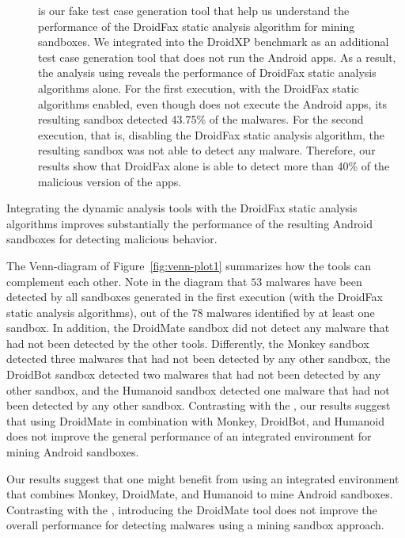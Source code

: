 \begin{description}
  \item[\joke] is our fake test case generation tool that help us understand the performance of the DroidFax static analysis algorithm for mining sandboxes. 
    We integrated \joke into the DroidXP benchmark as an additional test case generation tool that does not run the Android apps.
    As a result, the analysis using \joke reveals the performance of DroidFax static analysis algorithms alone. For the first execution, with the DroidFax static
    algorithms enabled, even though \joke does not execute the Android apps, its resulting sandbox detected 43.75\% of the malwares. For the second execution,
    that is, disabling the DroidFax static analysis algorithm, the resulting \joke sandbox was not able to detect any malware. Therefore,
    our results show that DroidFax alone is able to detect more than 40\% of the malicious version of the apps. 

\end{description}


\begin{finding}
  Integrating the dynamic analysis tools
  with the DroidFax static analysis algorithms
  improves substantially the performance
  of the resulting Android sandboxes for
  detecting malicious behavior. 
\end{finding}
 
The Venn-diagram of Figure~\ref{fig:venn-plot1}
summarizes how the tools can complement each other.
Note in the diagram that $53$ malwares have been detected
by all sandboxes generated in the first execution (with the DroidFax static analysis algorithms),
out of the 78 malwares identified by at least one sandbox. In addition, the DroidMate sandbox did not detect
any malware that had not been detected by the other tools. Differently, the Monkey sandbox detected
three malwares that had not been detected by any other sandbox, the DroidBot sandbox detected two malwares
that had not been detected by any other sandbox, and the Humanoid sandbox detected one malware that had not
been detected by any other sandbox. 
Contrasting with the \blls,
our results suggest that using DroidMate in combination with Monkey, DroidBot, and Humanoid
does not improve the general performance of an integrated environment for mining
Android sandboxes.

\begin{finding}
  Our results suggest that one might benefit from using  an integrated
  environment that combines Monkey, DroidMate, and Humanoid to
  mine Android sandboxes. Contrasting with the \blls, introducing the DroidMate 
  tool does not improve the overall performance for detecting malwares using
  a mining sandbox approach.
\end{finding}


